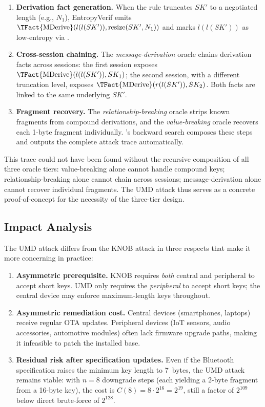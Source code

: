 \begin{enumerate}[leftmargin=*]
    \item \textbf{Derivation fact generation.}
    When the  rule truncates $SK'$ to a negotiated length (e.g., $N_1$), EntropyVerif emits $\text{\TFact{MDerive}}(l(l(SK')), \text{resize}(SK', N_1))$ and marks $l(l(SK'))$ as low-entropy via .
    \item \textbf{Cross-session chaining.}
    The \emph{message-derivation} oracle chains derivation facts across sessions: the first session exposes $\text{\TFact{MDerive}}(l(l(SK')), SK_1)$; the second session, with a different truncation level, exposes $\text{\TFact{MDerive}}(r(l(SK')), SK_2)$.
    Both facts are linked to the same underlying $SK'$.
    \item \textbf{Fragment recovery.}
    The \emph{relationship-breaking} oracle strips known fragments from compound derivations, and the \emph{value-breaking} oracle recovers each 1-byte fragment individually.
    \Tamarin{}'s backward search composes these steps and outputs the complete attack trace automatically.
\end{enumerate}

\noindent
This trace could not have been found without the recursive composition of all three oracle tiers: value-breaking alone cannot handle compound keys; relationship-breaking alone cannot chain across sessions; message-derivation alone cannot recover individual fragments.
The UMD attack thus serves as a concrete proof-of-concept for the necessity of the three-tier design.

\subsection{Impact Analysis}

The UMD attack differs from the KNOB attack in three respects that make it more concerning in practice:
\begin{enumerate}[leftmargin=*]
    \item \textbf{Asymmetric prerequisite.}
    KNOB requires \emph{both} central and peripheral to accept short keys.
    UMD only requires the \emph{peripheral} to accept short keys; the central device may enforce maximum-length keys throughout.

    \item \textbf{Asymmetric remediation cost.}
    Central devices (smartphones, laptops) receive regular OTA updates.
    Peripheral devices (IoT sensors, audio accessories, automotive modules) often lack firmware upgrade paths, making it infeasible to patch the installed base.

    \item \textbf{Residual risk after specification updates.}
    Even if the Bluetooth specification raises the minimum key length to 7~bytes, the UMD attack remains viable: with $n=8$ downgrade steps (each yielding a 2-byte fragment from a 16-byte key), the cost is $C(8) = 8 \cdot 2^{16} = 2^{19}$, still a factor of $2^{109}$ below direct brute-force of $2^{128}$.
\end{enumerate}

